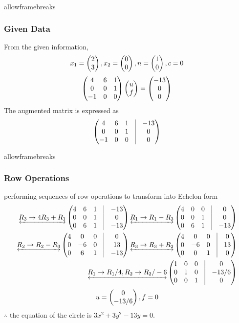 \documentclass{beamer}
\begin{document}
\begin{frame}{allowframebreaks}
\frametitle{Given Data}
From the given information,
\begin{align}
	x_1=\begin{pmatrix}2\\3\end{pmatrix}, x_2=\begin{pmatrix}0\\0\end{pmatrix},n=\begin{pmatrix}1\\0\end{pmatrix},c=0 
\end{align}
\begin{align}
    \begin{pmatrix}4 & 6 & 1 \\
               0 & 0 & 1 \\
               -1 & 0 & 0\end{pmatrix}
               \begin{pmatrix}u\\f\end{pmatrix}=\begin{pmatrix}-13\\0\\0\end{pmatrix}
\end{align}
The augmented matrix is expressed as
	\begin{align}
        \myvec{4 & 6 & 1 & \vrule & -13\\
         0 &  0 & 1 & \vrule & 0\\                                                 
         -1 &  0 & 0 & \vrule & 0}       
\end{align}
\end{frame}
\begin{frame}{allowframebreaks}
\frametitle{Row Operations}
performing sequences of row operations to transform into Echelon form
\begin{align}
	\underleftrightarrow{R_3 \rightarrow 4R_3+R_1}
         \myvec{4 & 6 & 1 & \vrule & -13\\
         0 &  0 & 1 & \vrule & 0\\
         0 &  6 & 1 & \vrule & -13}
         \underleftrightarrow{R_1\rightarrow R_1-R_3}
         \myvec{4 & 0 & 0 & \vrule & 0\\
         0 & 0 & 1 & \vrule & 0\\
         0 & 6 & 1 &\vrule & -13}\\
         \underleftrightarrow{R_2\rightarrow R_2-R_3}
         \myvec{4 & 0 & 0 &\vrule & 0\\
         0 & -6 & 0 & \vrule & 13 \\
         0 & 6 & 1 & \vrule & -13}
         \underleftrightarrow{R_3\rightarrow R_3+R_2}
         \myvec{4 & 0 & 0 &\vrule & 0\\
         0 & -6 & 0 & \vrule & 13 \\
         0 & 0 & 1 & \vrule & 0}\\
         \underleftrightarrow{R_1\rightarrow R_1/4, R_2 \rightarrow R_2/-6}
\myvec{1 & 0 & 0 &\vrule & 0\\
         0 & 1 & 0 & \vrule & -13/6 \\
         0 & 0 & 1 & \vrule & 0} 
\end{align}
\begin{align}
   u=\begin{pmatrix}0 \\ -13/6\end{pmatrix},f=0
\end{align}
$\therefore$ the equation of the circle is $3x^2+3y^2-13y=0$.
\end{frame}
\end{document}
